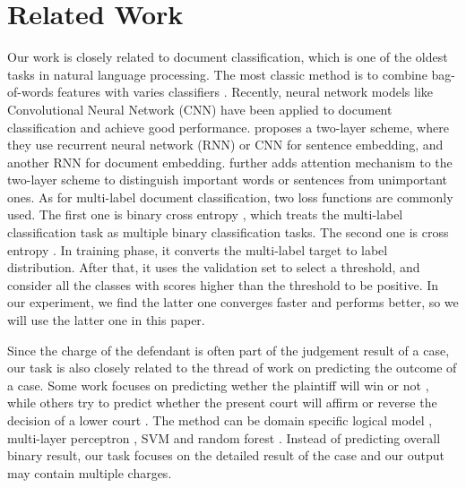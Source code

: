 \section{Related Work}
\label{sec_related_work}
Our work is closely related to document classification, which is one of the oldest tasks in natural language processing. The most classic method is to combine bag-of-words features with varies classifiers \cite{joachims1998text}. Recently, neural network models like Convolutional Neural Network (CNN) \cite{kim2014convolutional} have been applied to document classification and achieve good performance. \cite{tang2015document} proposes a two-layer scheme, where they use recurrent neural network (RNN) or CNN for sentence embedding, and another RNN for document embedding. \cite{yang2016hierarchical} further adds attention mechanism to the two-layer scheme to distinguish important words or sentences from unimportant ones. As for multi-label document classification, two loss functions are commonly used. The first one is binary cross entropy \cite{nam2014large}, which treats the multi-label classification task as multiple binary classification tasks. The second one is cross entropy \cite{kurata2016improved}. In training phase, it converts the multi-label target to label distribution. After that, it uses the validation set to select a threshold, and consider all the classes with scores higher than the threshold to be positive. In our experiment, we find the latter one converges faster and performs better, so we will use the latter one in this paper.



Since the charge of the defendant is often part of the judgement result of a case, our task is also closely related to the thread of work on predicting the outcome of a case. Some work focuses on predicting wether the plaintiff will win or not \cite{aletras2016predicting}, while others try to predict whether the present court will affirm or reverse the decision of a lower court \cite{katz2016general}. The method can be domain specific logical model \cite{bruninghaus2003predicting}, multi-layer perceptron \cite{bench1993neural}, SVM \cite{aletras2016predicting} and random forest \cite{katz2016general}. Instead of predicting overall binary result, our task focuses on the detailed result of the case and our output may contain multiple charges.

